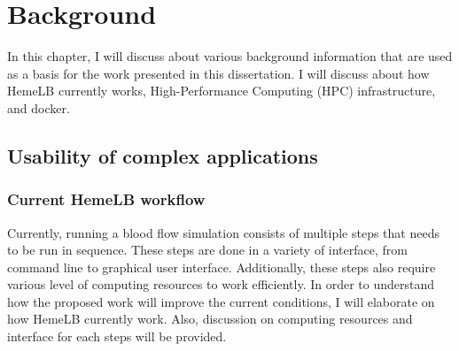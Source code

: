  

\chapter[Background]{Background}

In this chapter, I will discuss about various background information that are used as a basis for the work presented in this dissertation. I will discuss about how HemeLB currently works, High-Performance Computing (HPC) infrastructure, and docker.


\section{Usability of complex applications}

\subsection{Current HemeLB workflow}

Currently, running a blood flow simulation consists of multiple steps that needs to be run in sequence. These steps are done in a variety of interface, from command line to graphical user interface. Additionally, these steps also require various level of computing resources to work efficiently. In order to understand how the proposed work will improve the current conditions, I will elaborate on how HemeLB currently work. Also, discussion on computing resources and interface for each steps will be provided.




\vspace{1cm}

\noindent%
\begin{minipage}{\linewidth}%
\label{fig:hemelb-workflow}%
\end{minipage}

